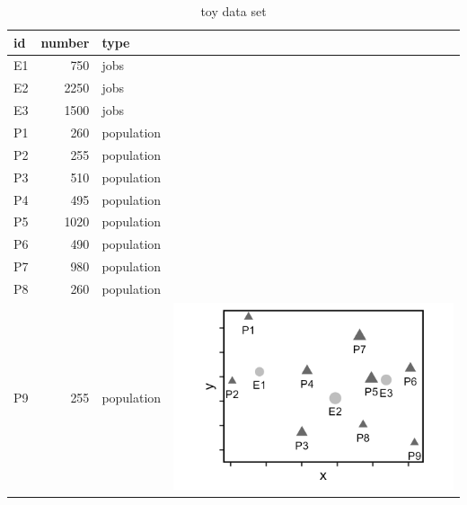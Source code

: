 \documentclass[]{elsarticle} %
\begin{document}
\begin{table}

\caption{\label{tab:toy-example-table}\label{tab:toy-example}toy data set}
\centering
\begin{tabular}[t]{lrl>{}l}
\toprule
id & number & type & \\
\midrule
E1 & 750 & jobs & \\

E2 & 2250 & jobs & \\

E3 & 1500 & jobs & \\

P1 & 260 & population & \\

P2 & 255 & population & \\

P3 & 510 & population & \\

P4 & 495 & population & \\

P5 & 1020 & population & \\

P6 & 490 & population & \\

P7 & 980 & population & \\

P8 & 260 & population & \\

P9 & 255 & population & \multirow{-12}{*}{\raggedright\arraybackslash \includegraphics{images/figure-1.png}}\\
\bottomrule
\end{tabular}
\end{table}
\end{document}
